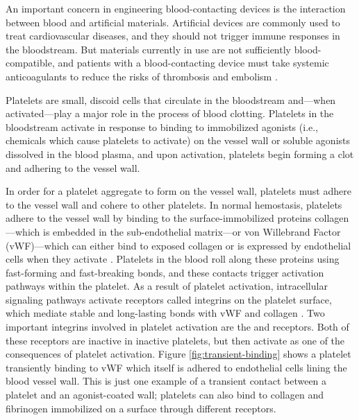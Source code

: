 \documentclass{biophys-new}
\begin{document}
An important concern in engineering blood-contacting devices is the
interaction between blood and artificial materials. Artificial devices
are commonly used to treat cardiovascular diseases, and they should
not trigger immune responses in the bloodstream. But materials
currently in use are not sufficiently blood-compatible, and patients
with a blood-contacting device must take systemic anti\-coagulants to
reduce the risks of thrombosis and embolism
\cite{Ratner1993,Ratner2007,Oprea13}.

Platelets are small, discoid cells that circulate in the bloodstream
and---when activated---play a major role in the process of blood
clotting. Platelets in the bloodstream activate in response
to binding to immobilized agonists (i.e., chemicals which cause
platelets to activate) on the vessel wall or soluble agonists
dissolved in the blood plasma, and upon activation, platelets begin
forming a clot and adhering to the vessel wall.

In order for a platelet aggregate to form on the vessel wall,
platelets must adhere to the vessel wall and cohere to other
platelets. In normal hemostasis, platelets adhere to the vessel wall
by binding to the surface-immobilized proteins collagen---which is
embedded in the sub-endothelial matrix---or von Willebrand Factor
(vWF)---which can either bind to exposed collagen or is expressed by
endothelial cells when they activate \cite{Fogelson2015}. Platelets in
the blood roll along these proteins using fast-forming and
fast-breaking bonds, and these contacts trigger activation pathways
within the platelet. As a result of platelet activation, intracellular
signaling pathways activate receptors called integrins on the platelet
surface, which mediate stable and long-lasting bonds with vWF and
collagen \cite{Bye2016,Li2010,Fogelson2015,Qiu2015}. Two important
integrins involved in platelet activation are the  and
 receptors. Both of these receptors are inactive in
inactive platelets, but then activate as one of the consequences of
platelet activation. Figure \ref{fig:transient-binding} shows a
platelet transiently binding to vWF which itself is adhered to
endothelial cells lining the blood vessel wall. This is just one
example of a transient contact between a platelet and an
agonist-coated wall; platelets can also bind to collagen and
fibrinogen immobilized on a surface through different receptors.

\end{document}
